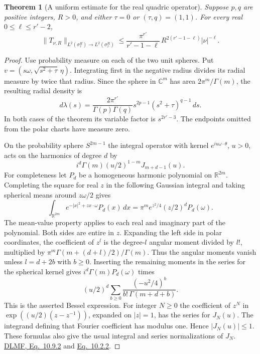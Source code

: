 \documentclass[a4paper,11pt]{article}
\newtheorem{theorem}[proposition]{Theorem}
\theoremstyle{definition}
\theoremstyle{remark}
\numberwithin{equation}{section}
\begin{document}
\begin{theorem}[A uniform estimate for the real quadric operator]
\leavevmode\label{thm:realquadrics911}
Suppose \(p,q\) are positive integers, \(R>0\), and either
\(\tau=0\) or \((\tau,q)=(1,1)\). For every real
\(0\le\ell\le r'-2\),
\begin{equation}
 \|T_{\nu,R}\|_{L^2(\sigma_\tau^R)\to L^2(\sigma_\tau^R)}
 \le \frac{\pi^{r'}}{r'-1-\ell}\,
         R^{2(r'-1-\ell)}|\nu|^{-\ell}.
 \label{eq:realquadrics911}
\end{equation}
\end{theorem}
\begin{proof}
Use probability measure on each of the two unit spheres. Put
\(v=(s\omega,\sqrt{s^2+\tau}\,\eta)\). Integrating first in
the negative radius divides its radial measure by twice that
radius. Since the sphere in \(\mathbb C^m\) has area
\(2\pi^m/\Gamma(m)\), the resulting radial density is
\[
 d\lambda(s)=
 \frac{2\pi^{r'}}{\Gamma(p)\Gamma(q)}
          s^{2p-1}(s^2+\tau)^{q-1}\,ds.
\]
In both cases of the theorem its variable factor is \(s^{2r'-3}\).
The endpoints omitted from the polar charts have measure zero.

On the probability sphere \(S^{2m-1}\) the integral operator
with kernel \(e^{iu\omega\cdot\theta}\), \(u>0\), acts on the
harmonics of degree \(d\) by
\[
       i^d\Gamma(m)(u/2)^{1-m}J_{m+d-1}(u).
\]
For completeness let \(P_d\) be a homogeneous harmonic
polynomial on \(\mathbb R^{2m}\). Completing the square for real
\(z\) in the following Gaussian integral and taking spherical
means around \(z\omega/2\) gives
\[
 \int_{\mathbb R^{2m}}e^{-|x|^2+z x\cdot\omega}P_d(x)\,dx
      =\pi^m e^{z^2/4}(z/2)^d P_d(\omega).
\]
The mean-value property applies to each real and imaginary
part of the polynomial. Both sides are entire in \(z\).
Expanding the left side in polar coordinates, the coefficient
of \(z^l\) is the degree-\(l\) angular moment divided by \(l!\),
multiplied by \(\pi^m\Gamma(m+(d+l)/2)/\Gamma(m)\).
Thus the angular moments vanish unless \(l=d+2b\) with \(b\ge0\).
Inserting the remaining moments in the series for the spherical
kernel gives \(i^d\Gamma(m)P_d(\omega)\) times
\[
  (u/2)^d\sum_{b\ge0}
       \frac{(-u^2/4)^b}{b!\,\Gamma(m+d+b)}.
\]
This is the asserted Bessel expression. For integer \(N\ge0\)
the coefficient of \(z^N\) in
\(\exp((u/2)(z-z^{-1}))\), expanded on \(|z|=1\), has the
series for \(J_N(u)\). The integrand defining that Fourier
coefficient has modulus one. Hence \(|J_N(u)|\le1\).
These formulas also give the usual integral and series
normalizations of \(J_N\).
\href{https://dlmf.nist.gov/10.9.E2}{DLMF, Eq.~10.9.2} and
\href{https://dlmf.nist.gov/10.2.E2}{Eq.~10.2.2}.


\end{proof}
\end{document}
